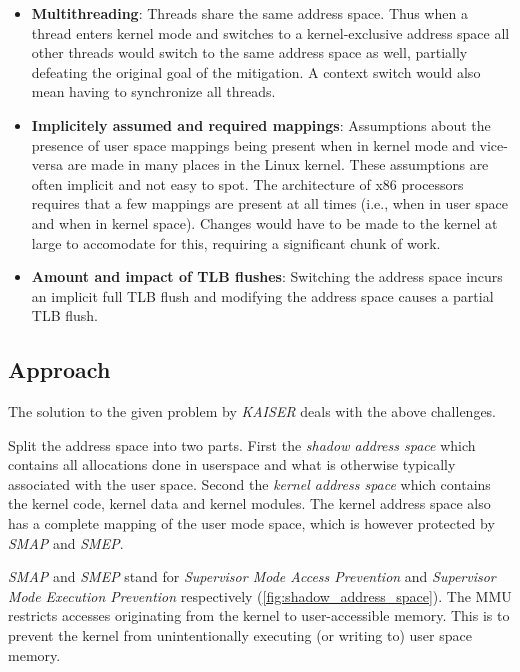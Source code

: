 \begin{itemize}
  \item{
    \textbf{Multithreading}:
    Threads share the same address space.
    Thus when a thread enters kernel mode and switches to a kernel-exclusive address space all other threads would switch to the same address space as well, partially defeating the original goal of the mitigation.
    A context switch would also mean having to synchronize all threads.
  }
  \item{
    \textbf{Implicitely assumed and required mappings}:
    Assumptions about the presence of user space mappings being present when in kernel mode and vice-versa are made in many places in the Linux kernel.
    These assumptions are often implicit and not easy to spot.
    The architecture of x86 processors requires that a few mappings are present at all times (i.e., when in user space and when in kernel space).
    Changes would have to be made to the kernel at large to accomodate for this, requiring a significant chunk of work.
  }
  \item{
    \textbf{Amount and impact of TLB flushes}:
    Switching the address space incurs an implicit full TLB flush and modifying the address space causes a partial TLB flush. \cite{the-ginormous-intel-manual-volume-3}
  }
\end{itemize}

\subsection{Approach}

The solution to the given problem by \textit{KAISER} deals with the above challenges.

Split the address space into two parts. First the \textit{shadow address space} which contains all allocations done in userspace and what is otherwise typically associated with the user space.
Second the \textit{kernel address space} which contains the kernel code, kernel data and kernel modules.
The kernel address space also has a complete mapping of the user mode space, which is however protected by \textit{SMAP} and \textit{SMEP}.

\textit{SMAP} and \textit{SMEP} stand for \textit{Supervisor Mode Access Prevention} and \textit{Supervisor Mode Execution Prevention} respectively (\autoref{fig:shadow_address_space}).
The MMU restricts accesses originating from the kernel to user-accessible memory.
This is to prevent the kernel from unintentionally executing (or writing to) user space memory.\cite{smap}


